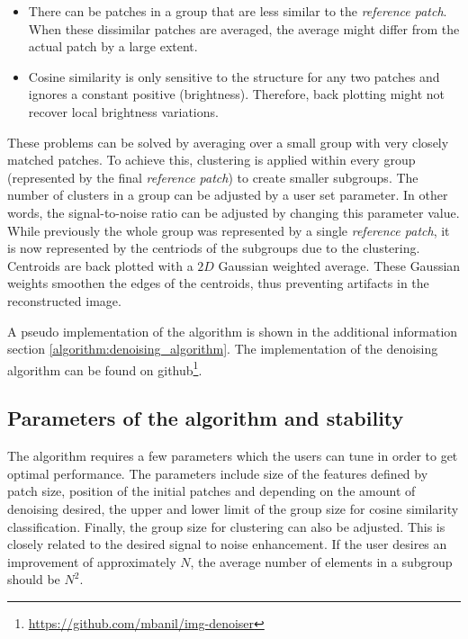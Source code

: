 \documentclass[fleqn,10pt]{wlscirep}
\begin{document}
	\begin{itemize}
		\item There can be patches in a group that are less similar to the \textit{reference patch}. When these dissimilar patches are averaged, the average might differ from the actual patch by a large extent. 
		\item Cosine similarity is only sensitive to the structure for any two patches and ignores a constant positive (brightness). Therefore, back plotting might not recover local brightness variations.
	\end{itemize}
	
	These problems can be solved by averaging over a small group with very closely matched patches. To achieve this, clustering is applied within every group (represented by the final \textit{reference patch}) to create smaller subgroups. The number of clusters in a group can be adjusted by a user set parameter. In other words, the signal-to-noise ratio can be adjusted by changing this parameter value. While previously the whole group was represented by a single \textit{reference patch}, it is now represented by the centriods of the subgroups due to the clustering. Centroids are back plotted with a $2D$ Gaussian weighted average. These Gaussian weights smoothen the edges of the centroids, thus preventing artifacts in the reconstructed image. 
	
	A pseudo implementation of the algorithm is shown in the additional information section \ref{algorithm:denoising_algorithm}. The implementation of the denoising algorithm can be found on github\footnote{\url{https://github.com/mbanil/img-denoiser}}.
	
	\subsection*{Parameters of the algorithm and stability}
	
	The algorithm requires a few parameters which the users can tune in order to get optimal performance. The parameters include size of the features defined by patch size, position of the initial patches and depending on the amount of denoising desired, the upper and lower limit of the group size for cosine similarity classification. Finally, the group size for clustering can also be adjusted. This is closely related to the desired signal to noise enhancement. If the user desires an improvement of approximately $N$, the average number of elements in a subgroup should be $N^2$.
	
\end{document}

